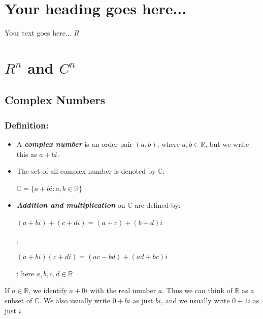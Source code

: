 \documentclass{report}
\begin{document}
\section{Your heading goes here...}

Your text goes here...
$R$

\section{$R^n$ and $C^n$}
\subsection{Complex Numbers}
\subsubsection{Definition:}
\begin{itemize}
    \item A \textbf{\textit{complex number}} is an order pair $(a,b)$, where $a, b \in \mathbb{R}$, but we write this as $a+bi$.
    \item The set of all complex number is denoted by $\mathbb{C}$:\newline
   \centerline{$\mathbb{C}=\{a+bi:a,b \in \mathbb{R}\}$}
   \item \textbf{\textit{Addition and multiplication}} on $\mathbb{C}$ are defined by:\newline
   \centerline{$(a+bi)+(c+di)=(a+c)+(b+d)i$},\newline
   \centerline{$(a+bi)(c+di)=(ac-bd)+(ad+bc)i$};\newline
   here $a,b,c,d \in \mathbb{R}$
\end{itemize}

If $a \in \mathbb{R}$, we identify $a+0i$ with the real number $a$. Thus we can think of $\mathbb{R}$ as a subset of $\mathbb{C}$. We also usually write $0+bi$ as just $bi$, and we usually write $0+1i$ as just $i$.
\end{document}
